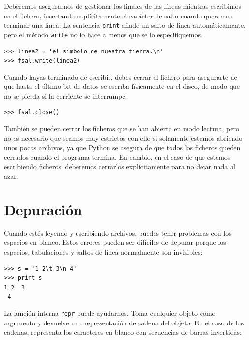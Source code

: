 Deberemos asegurarnos de gestionar los finales de las líneas mientras
escribimos en el fichero, insertando explícitamente el carácter de salto
cuando queramos terminar una línea. La sentencia {\tt print}
añade un salto de línea automáticamente, pero el método
{\tt write} no lo hace a menos que se lo especifiquemos.

\beforeverb
\begin{verbatim}
>>> linea2 = 'el símbolo de nuestra tierra.\n'
>>> fsal.write(linea2)
\end{verbatim}
\afterverb
%
Cuando hayas terminado de escribir, debes cerrar el fichero
para asegurarte de que hasta el último bit de datos se escriba
físicamente en el disco, de modo que no se pierda si la corriente se interrumpe.

\beforeverb
\begin{verbatim}
>>> fsal.close()
\end{verbatim}
\afterverb
%
También se pueden cerrar los ficheros que se han abierto en modo lectura,
pero no es necesario que seamos muy estrictos con ello si solamente
estamos abriendo unos pocos archivos, ya que Python se asegura de que
todos los ficheros queden cerrados cuando el programa termina. En cambio, en el caso
de que estemos escribiendo ficheros, deberemos cerrarlos explícitamente
para no dejar nada al azar.



\section{Depuración}


Cuando estés leyendo y escribiendo archivos, puedes tener problemas
con los espacios en blanco. Estos errores pueden ser difíciles de depurar porque los espacios,
tabulaciones y saltos de línea normalmente son invisibles:

\beforeverb
\begin{verbatim}
>>> s = '1 2\t 3\n 4'
>>> print s
1 2	 3
 4
\end{verbatim}
\afterverb


La función interna {\tt repr} puede ayudarnos. Toma cualquier objeto como
argumento y devuelve una representación de cadena del objeto. En el caso
de las cadenas, representa los caracteres en blanco
con secuencias de barras invertidas:

